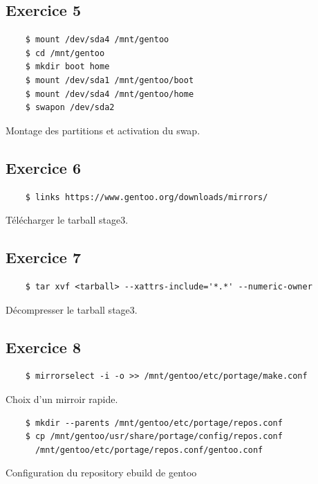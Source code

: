 \documentclass{report}
\begin{document}
\subsection{Exercice 5}
\begin{tcolorbox}
  \begin{verbatim}
    $ mount /dev/sda4 /mnt/gentoo
    $ cd /mnt/gentoo
    $ mkdir boot home
    $ mount /dev/sda1 /mnt/gentoo/boot
    $ mount /dev/sda4 /mnt/gentoo/home
    $ swapon /dev/sda2
  \end{verbatim}
\end{tcolorbox}
Montage des partitions et activation du swap.

\subsection{Exercice 6}
\begin{tcolorbox}
  \begin{verbatim}
    $ links https://www.gentoo.org/downloads/mirrors/
  \end{verbatim}
\end{tcolorbox}
Télécharger le tarball stage3.

\subsection{Exercice 7}
\begin{tcolorbox}
  \begin{verbatim}
    $ tar xvf <tarball> --xattrs-include='*.*' --numeric-owner
  \end{verbatim}
\end{tcolorbox}
Décompresser le tarball stage3.

\subsection{Exercice 8}
\begin{tcolorbox}
  \begin{verbatim}
    $ mirrorselect -i -o >> /mnt/gentoo/etc/portage/make.conf
  \end{verbatim}
\end{tcolorbox}
Choix d'un mirroir rapide.

\begin{tcolorbox}
  \begin{verbatim}
    $ mkdir --parents /mnt/gentoo/etc/portage/repos.conf
    $ cp /mnt/gentoo/usr/share/portage/config/repos.conf
      /mnt/gentoo/etc/portage/repos.conf/gentoo.conf
  \end{verbatim}
\end{tcolorbox}
Configuration du repository ebuild de gentoo
\end{document}
